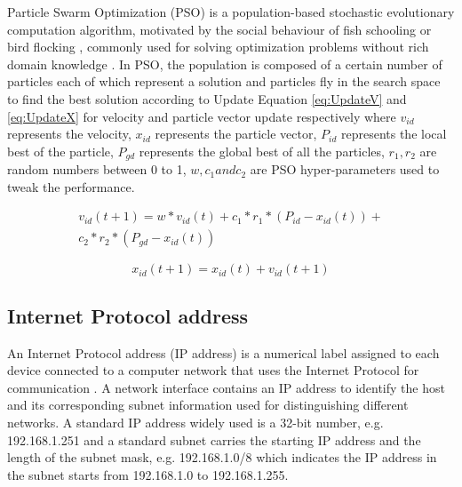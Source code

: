 \documentclass[conference]{IEEEtran}
\begin{document}
Particle Swarm Optimization (PSO) is a population-based stochastic evolutionary computation algorithm, motivated by the social behaviour of fish schooling or bird flocking \cite{PSOIntro:Kennedy} \cite{PSOIntro:Eberhart}, commonly used for solving optimization problems without rich domain knowledge \cite{PSOIntro:Yanan}. In PSO, the population is composed of a certain number of particles each of which represent a solution and particles fly in the search space to find the best solution according to Update Equation \ref{eq:UpdateV} and \ref{eq:UpdateX} for velocity and particle vector update respectively where $v_{id}$ represents the velocity, $x_{id}$ represents the particle vector, $P_{id}$ represents the local best of the particle, $P_{gd}$ represents the global best of all the particles, $r_{1}, r_{2}$ are random numbers between 0 to 1, $w, c_{1} and c_{2}$ are PSO hyper-parameters used to tweak the performance. 

\begin{equation}\label{eq:UpdateV}
	\begin{aligned}
	v_{id}(t+1) = w * v_{id}(t) + c_{1} * r_{1} * (P_{id} - x_{id}(t)) + \\
	c_{2} * r_{2} * (P_{gd} - x_{id}(t))
	\end{aligned}
\end{equation}

\begin{equation}\label{eq:UpdateX}
	x_{id}(t+1) = x_{id}(t) + v_{id}(t+1)
\end{equation}

\subsection{Internet Protocol address}

An Internet Protocol address (IP address) is a numerical label assigned to each device connected to a computer network that uses the Internet Protocol for communication \cite{IP:Postel}. A network interface contains an IP address to identify the host and its corresponding subnet information used for distinguishing different networks. A standard IP address widely used is a 32-bit number, e.g. 192.168.1.251 and a standard subnet carries the starting IP address and the length of the subnet mask, e.g. 192.168.1.0/8 which indicates the IP address in the subnet starts from 192.168.1.0 to 192.168.1.255. 
\end{document}
